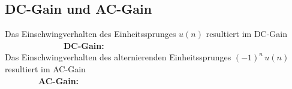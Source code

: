 	\subsection{DC-Gain und AC-Gain}
		Das Einschwingverhalten des Einheitssprunges $u(n)$ resultiert im DC-Gain\\[0.2cm]		$\qquad\qquad\quad\qquad$\textbf{DC-Gain:}$\quad$\\[0.2cm]
		Das Einschwingverhalten des alternierenden Einheitssprunges $(-1)^n\,u(n)$ resultiert im AC-Gain\\[0.2cm]
		$\qquad\qquad$\textbf{AC-Gain:}$\quad$
\newpage
